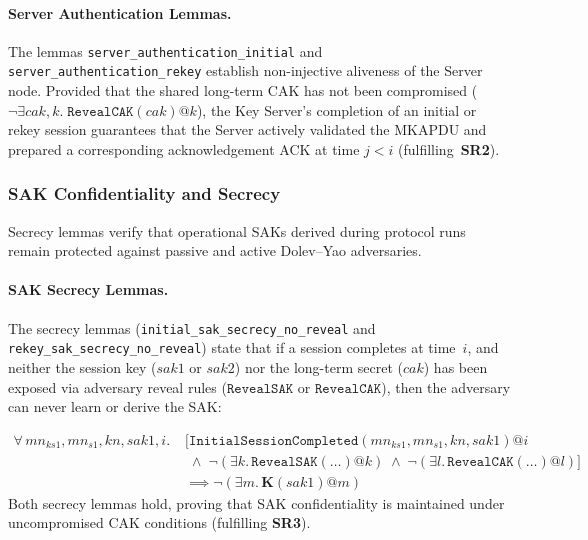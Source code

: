 \begin{sloppypar}
\paragraph{Server Authentication Lemmas.}
The lemmas \texttt{server\_\allowbreak{}authentication\_\allowbreak{}initial} and \texttt{server\_\allowbreak{}authentication\_\allowbreak{}rekey} establish non-injective aliveness of the Server node.
Provided that the shared long-term CAK has not been compromised ($\neg \exists \mathit{cak}, k.\; \mathtt{RevealCAK}(\mathit{cak})@k$), the Key Server's completion of an initial or rekey session guarantees that the Server actively validated the MKAPDU and prepared a corresponding acknowledgement ACK at time $j < i$ (fulfilling~\textbf{SR2}).
\end{sloppypar}

\subsubsection{SAK Confidentiality and Secrecy}
Secrecy lemmas verify that operational SAKs derived during protocol runs remain protected against passive and active Dolev--Yao adversaries.

\begin{sloppypar}
\paragraph{SAK Secrecy Lemmas.} The secrecy lemmas (\texttt{initial\_\allowbreak{}sak\_\allowbreak{}secrecy\_\allowbreak{}no\_\allowbreak{}reveal} and \texttt{rekey\_\allowbreak{}sak\_\allowbreak{}secrecy\_\allowbreak{}no\_\allowbreak{}reveal}) state that if a session completes at time~$i$, and neither the session key ($\mathit{sak1}$ or $\mathit{sak2}$) nor the long-term secret ($\mathit{cak}$) has been exposed via adversary reveal rules ($\mathtt{RevealSAK}$ or $\mathtt{RevealCAK}$), then the adversary can never learn or derive the SAK:
\end{sloppypar}
{\small
\begin{equation*}
\begin{split}
\forall \, \mathit{mn_{ks1}}, \mathit{mn_{s1}}, \mathit{kn}, \mathit{sak1}, i. \; & \bigl[ \mathtt{InitialSessionCompleted}(\mathit{mn_{ks1}},\mathit{mn_{s1}},\mathit{kn},\mathit{sak1})@i \\
& \;\land\; \neg(\exists k.\, \mathtt{RevealSAK}(\ldots)@k) \;\land\; \neg(\exists l.\, \mathtt{RevealCAK}(\ldots)@l) \bigr] \\
& \implies \neg(\exists m.\, \mathbf{K}(\mathit{sak1})@m)
\end{split}
\end{equation*}}
Both secrecy lemmas hold, proving that SAK confidentiality is maintained under uncompromised CAK conditions (fulfilling \textbf{SR3}).

